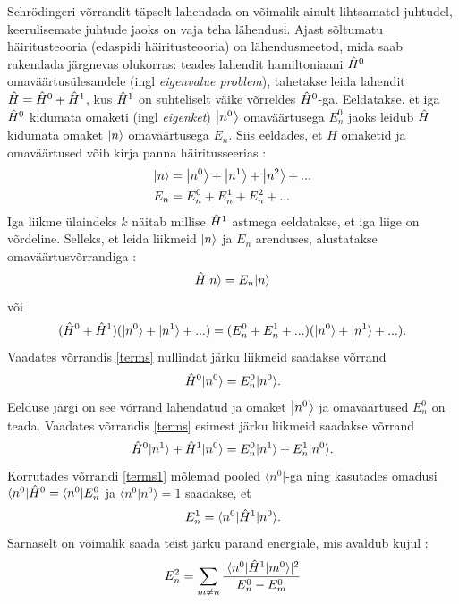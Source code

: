 \documentclass{trkut}%
\renewcommand\bra[1]{{\langle{#1}|}}
\renewcommand\ket[1]{{|{#1}\rangle}}
\renewcommand\Ket[1]{\mleft|#1\mright\rangle}
\renewcommand\braket[1]{\langle{#1}\rangle}
\begin{document}
Schrödingeri võrrandit täpselt lahendada on võimalik ainult lihtsamatel juhtudel, keerulisemate juhtude jaoks on vaja teha lähendusi.
Ajast sõltumatu häiritusteooria (edaspidi häiritusteooria) on lähendusmeetod, mida saab rakendada järgnevas olukorras: teades lahendit hamiltoniaani $\op[0]{H}$ omaväärtusülesandele (ingl \textit{eigenvalue problem}), tahetakse leida lahendit $\op{H}=\op[0]{H}+\op[1]{H}$, kus $\op[1]{H}$ on suhteliselt väike võrreldes $\op[0]{H}$-ga.
Eeldatakse, et iga $\op[0]{H}$ kidumata omaketi (ingl \textit{eigenket}) $\Ket{n^0}$ omaväärtusega $E_n^0$ jaoks leidub $\op{H}$ kidumata omaket $\Ket{n}$ omaväärtusega $E_n$.
Siis eeldades, et $H$ omaketid ja omaväärtused võib kirja panna häiritusseerias \parencite[451]{shankar94}:
\begin{align}
    \Ket{n}&=\Ket{n^0}+\Ket{n^1}+\Ket{n^2}+... \\
    E_n&=E_n^0+E_n^1+E_n^2+...
\end{align}
Iga liikme ülaindeks $k$ näitab millise $\op[1]{H}$ astmega eeldatakse, et iga liige on võrdeline.
Selleks, et leida liikmeid $\Ket{n}$ ja $E_n$ arenduses, alustatakse omaväärtusvõrrandiga \parencite[451-452]{shankar94}:
\begin{equation}
    \op{H}\ket{n}=E_n\ket{n}
\end{equation}
või
\begin{equation}
    (\op[0]{H} + \op[1]{H})(\ket{n^0}+\ket{n^1}+...)=(E_n^0+E_n^1+...) (\ket{n^0}+\ket{n^1}+...).
    \label{terms}
\end{equation}
Vaadates võrrandis \eqref{terms} nullindat järku liikmeid saadakse võrrand
\begin{equation}
    \op[0]{H}\ket{n^0}=E_n^0\ket{n^0}.
\end{equation}
Eelduse järgi on see võrrand lahendatud ja omaket $\Ket{n^0}$ ja omaväärtused $E_n^0$ on teada. Vaadates võrrandis \eqref{terms} esimest järku liikmeid saadakse võrrand
\begin{equation}
    \op[0]{H}\ket{n^1} + \op[1]{H}\ket{n^0} = E_n^0\ket{n^1} + E_n^1\ket{n^0}.
    \label{terms1}
\end{equation}
Korrutades võrrandi \eqref{terms1} mõlemad pooled $\bra{n^0}$-ga ning kasutades omadusi $\bra{n^0}\op[0]{H}=\bra{n^0}E_n^0$ ja $\braket{n^0|n^0}=1$ saadakse, et
\begin{equation}
    E_n^1=\braket{n^0|\op[1]{H}|n^0}.
\end{equation}
Sarnaselt on võimalik saada teist järku parand energiale, mis avaldub kujul \parencite[451-453]{shankar94}:
\begin{equation}
    E_n^2=\sum_{m \neq n} \frac{|\braket{n^0|\op[1]{H}|m^0}|^2}{E_n^0-E_m^0}
\end{equation}
\end{document}
